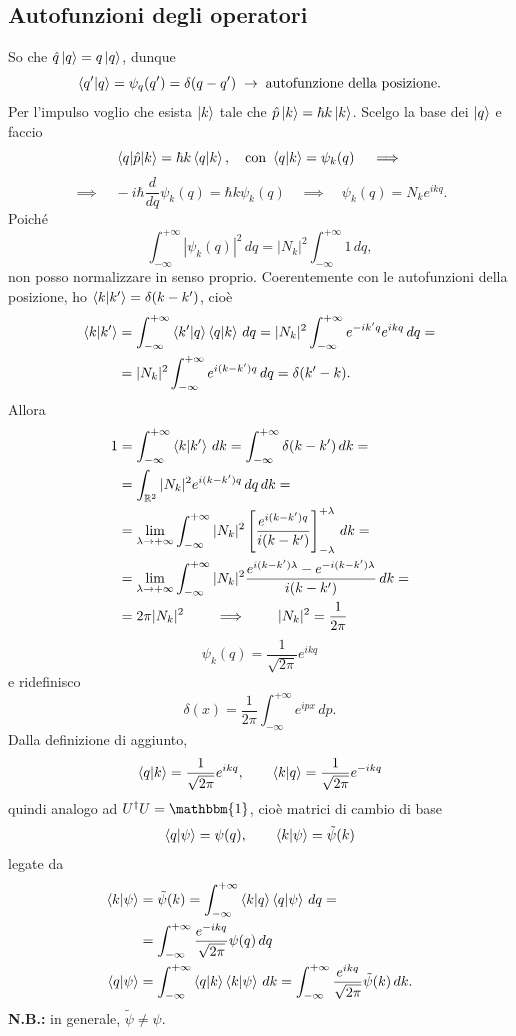 \subsection{Autofunzioni degli operatori}
So che \( \hat{q} \ket{q} = q \ket{q} \), dunque
\[
\braket{q^\prime|q} = \psi_q(q^\prime) = \delta(q - q^\prime) \; \rightarrow \; \text{autofunzione della posizione.}
\]
Per l'impulso voglio che esista \( \ket{k} \) tale che \( \hat{p} \ket{k} = \hbar k \ket{k} \). Scelgo la base dei \( \ket{q} \) e faccio
\[
\braket{q|\hat{p}|k} = \hbar k \braket{q|k}, \quad \text{con } \braket{q|k} = \psi_k(q) \quad \implies
\]
\[
\implies \quad -i \hbar \frac{d}{dq} \psi_k(q) = \hbar k \psi_k(q) \quad \implies \quad \psi_k(q) = N_k e^{ikq}.
\]
Poiché
\[
\int_{-\infty}^{+\infty} \left| \psi_k(q) \right|^2 \, dq = |N_k|^2 \int_{-\infty}^{+\infty} 1 \, dq,
\]
non posso normalizzare in senso proprio. Coerentemente con le autofunzioni della posizione, ho \( \braket{k|k^\prime} = \delta(k - k^\prime) \), cioè
\begin{align*}
\braket{k|k^\prime} &= \int_{-\infty}^{+\infty} \braket{k^\prime|q} \braket{q|k} \, dq = |N_k|^2 \int_{-\infty}^{+\infty} e^{-i k^\prime q} e^{ikq} \, dq = \\
&= |N_k|^2 \int_{-\infty}^{+\infty} e^{i (k - k^\prime) q} \, dq = \delta(k^\prime - k).
\end{align*}
Allora
\begin{align*}
1 &= \int_{-\infty}^{+\infty} \braket{k|k'} \, dk = \int_{-\infty}^{+\infty} \delta(k - k') \, dk = \\
&= \int_{\mathbb{R}^2} |N_k|^2 e^{i (k - k^\prime) q} \, dq \, dk = \\
&= \lim_{\lambda \rightarrow +\infty} \int_{-\infty}^{+\infty} |N_k|^2 \left[ \frac{e^{i (k - k^\prime) q}}{i (k - k^\prime)} \right]_{-\lambda}^{+\lambda} \, dk = \\
&= \lim_{\lambda \rightarrow +\infty} \int_{-\infty}^{+\infty} |N_k|^2 \frac{e^{i (k - k^\prime) \lambda} - e^{-i (k - k^\prime) \lambda}}{i (k - k^\prime)} \, dk = \\
&= 2 \pi |N_k|^2 \qquad \implies \qquad |N_k|^2 = \frac{1}{2\pi}
\end{align*}
\[
\psi_k(q) = \frac{1}{\sqrt{2\pi}} e^{ikq}
\]
e ridefinisco
\[
\delta(x) = \frac{1}{2\pi} \int_{-\infty}^{+\infty} e^{ipx} \, dp.
\]
Dalla definizione di aggiunto,
\[
\braket{q|k} = \frac{1}{\sqrt{2\pi}} e^{ikq}, \qquad \braket{k|q} = \frac{1}{\sqrt{2\pi}} e^{-ikq}
\]
quindi analogo ad \( U^\dag U = \mathbbm{1} \), cioè matrici di cambio di base
\[
\braket{q|\psi} = \psi(q), \qquad \braket{k|\psi} = \tilde{\psi}(k)
\]
legate da
\begin{align*}
\braket{k|\psi} &= \tilde{\psi}(k) = \int_{-\infty}^{+\infty} \braket{k|q} \braket{q|\psi} \, dq = \\
&= \int_{-\infty}^{+\infty} \frac{e^{-ikq}}{\sqrt{2\pi}} \psi(q) \, dq \\
\braket{q|\psi} &= \int_{-\infty}^{+\infty} \braket{q|k} \braket{k|\psi} \, dk = \int_{-\infty}^{+\infty} \frac{e^{ikq}}{\sqrt{2\pi}} \tilde{\psi}(k) \, dk.
\end{align*}
\textbf{N.B.:} in generale, \( \tilde{\psi} \neq \psi \).

